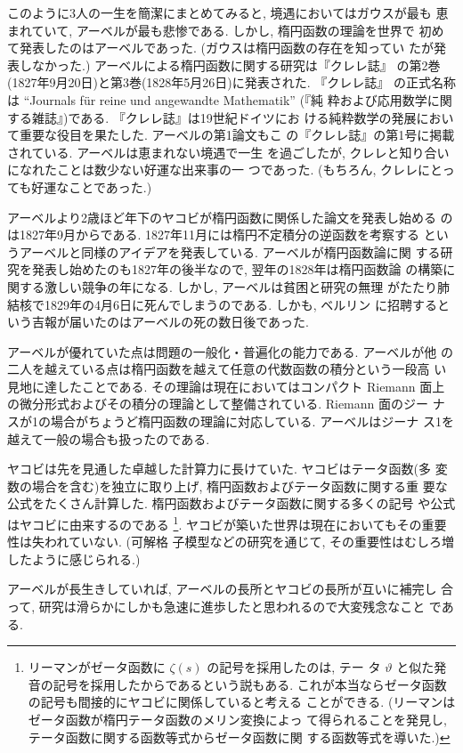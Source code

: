 \documentclass[12pt,twoside]{jarticle}
\begin{document}
このように3人の一生を簡潔にまとめてみると, 境遇においてはガウスが最も
恵まれていて, アーベルが最も悲惨である. しかし, 楕円函数の理論を世界で
初めて発表したのはアーベルであった. (ガウスは楕円函数の存在を知ってい
たが発表しなかった.) アーベルによる楕円函数に関する研究は『クレレ誌』
の第2巻(1827年9月20日)と第3巻(1828年5月26日)に発表された. 『クレレ誌』
の正式名称は ``Journals f\"ur reine und angewandte Mathematik'' (『純
粋および応用数学に関する雑誌』)である. 『クレレ誌』は19世紀ドイツにお
ける純粋数学の発展において重要な役目を果たした. アーベルの第1論文もこ
の『クレレ誌』の第1号に掲載されている. アーベルは恵まれない境遇で一生
を過ごしたが, クレレと知り合いになれたことは数少ない好運な出来事の一
つであった. (もちろん, クレレにとっても好運なことであった.)

アーベルより2歳ほど年下のヤコビが楕円函数に関係した論文を発表し始める
のは1827年9月からである. 1827年11月には楕円不定積分の逆函数を考察する
というアーベルと同様のアイデアを発表している. アーベルが楕円函数論に関
する研究を発表し始めたのも1827年の後半なので, 翌年の1828年は楕円函数論
の構築に関する激しい競争の年になる. しかし, アーベルは貧困と研究の無理
がたたり肺結核で1829年の4月6日に死んでしまうのである. しかも, ベルリン
に招聘するという吉報が届いたのはアーベルの死の数日後であった.

アーベルが優れていた点は問題の一般化・普遍化の能力である. アーベルが他
の二人を越えている点は楕円函数を越えて任意の代数函数の積分という一段高
い見地に達したことである. その理論は現在においてはコンパクト Riemann 
面上の微分形式およびその積分の理論として整備されている. Riemann 面のジー
ナスが1の場合がちょうど楕円函数の理論に対応している. アーベルはジーナ
ス1を越えて一般の場合も扱ったのである.

ヤコビは先を見通した卓越した計算力に長けていた. ヤコビはテータ函数(多
変数の場合を含む)を独立に取り上げ, 楕円函数およびテータ函数に関する重
要な公式をたくさん計算した. 楕円函数およびテータ函数に関する多くの記号
や公式はヤコビに由来するのである%
\footnote{リーマンがゼータ函数に $\zeta(s)$ の記号を採用したのは, テー
  タ $\vartheta$ と似た発音の記号を採用したからであるという説もある.
  これが本当ならゼータ函数の記号も間接的にヤコビに関係していると考える
  ことができる. (リーマンはゼータ函数が楕円テータ函数のメリン変換によっ
  て得られることを発見し, テータ函数に関する函数等式からゼータ函数に関
  する函数等式を導いた.)}. %
ヤコビが築いた世界は現在においてもその重要性は失われていない. (可解格
子模型などの研究を通じて, その重要性はむしろ増したように感じられる.)

アーベルが長生きしていれば, アーベルの長所とヤコビの長所が互いに補完し
合って, 研究は滑らかにしかも急速に進歩したと思われるので大変残念なこと
である.
\end{document}
